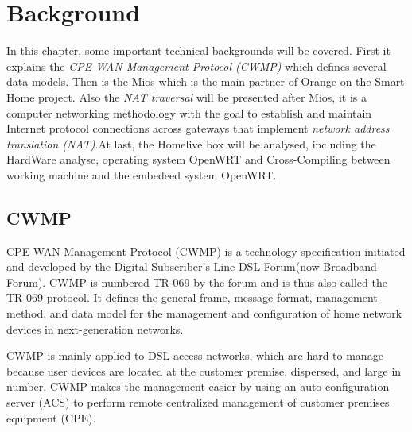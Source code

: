 
\chapter{Background} %

\label{Chapter3} %

In this chapter, some important technical backgrounds will be covered. First it explains the \textit{CPE WAN Management Protocol (CWMP)} which defines several data models. Then is the Mios which is the main partner of Orange on the Smart Home project. Also the \textit{NAT traversal} will be presented after Mios, it is a computer networking methodology with the goal to establish and maintain Internet protocol connections across gateways that implement \textit{network address translation (NAT)}.At last, the Homelive box will be analysed, including the HardWare analyse, operating system OpenWRT and Cross-Compiling between working machine and the embedeed system OpenWRT.

\section{CWMP}

CPE WAN Management Protocol (CWMP) is a technology specification initiated and developed by the Digital Subscriber’s Line DSL Forum(now Broadband Forum). CWMP is numbered TR-069 by the forum and is thus also called the TR-069 protocol. It defines the general frame, message format, management method, and data model for the management and configuration of home network devices in next-generation networks.

CWMP is mainly applied to DSL access networks, which are hard to manage because user devices are located at the customer premise, dispersed, and large in number. CWMP makes the management easier by using an auto-configuration server (ACS) to perform remote centralized management of customer premises equipment (CPE).



